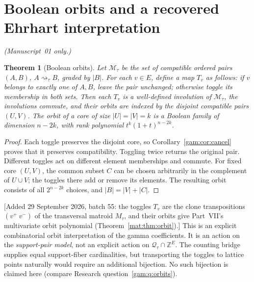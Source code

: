 \documentclass[11pt]{article}
\numberwithin{equation}{section}
\newtheorem{theorem}{Theorem}[section]
\theoremstyle{definition}
\newcommand{\Z}{\mathbb Z}
\newcommand{\Qt}{\mathcal Q_\tau}
\newcommand{\match}{\rightsquigarrow}
\begin{document}
\section{Boolean orbits and a recovered Ehrhart interpretation}\label{gam:gv:sec:orbits}
\noindent\emph{(Manuscript~01 only.)}
\begin{theorem}[Boolean orbits]\label{gam:gv:thm:orbits}
Let $\mathscr M_\tau$ be the set of compatible ordered pairs $(A,B)$,
$A\match_\tau B$, graded by $|B|$. For each $v\in E$, define a map $T_v$ as
follows: if $v$ belongs to exactly one of $A,B$, leave the pair unchanged;
otherwise toggle its membership in both sets. Then each $T_v$ is a
well-defined involution of $\mathscr M_\tau$, the involutions commute, and
their orbits are indexed by the disjoint compatible pairs $(U,V)$. The orbit
of a core of size $|U|=|V|=k$ is a Boolean family of dimension $n-2k$, with
rank polynomial $t^k(1+t)^{n-2k}$.
\end{theorem}
\begin{proof}
Each toggle preserves the disjoint core, so
Corollary~\ref{gam:cor:cancel} proves that it preserves compatibility.
Toggling twice returns the original pair. Different toggles act on different
element memberships and commute. For fixed core $(U,V)$, the common subset
$C$ can be chosen arbitrarily in the complement of $U\cup V$; the toggles
there add or remove its elements. The resulting orbit consists of all
$2^{n-2k}$ choices, and $|B|=|V|+|C|$.
\end{proof}
[Added 29 September 2026, batch 55: the toggles $T_v$ are the clone
transpositions $(v^+\ v^-)$ of the transversal matroid $M_\tau$, and their
orbits give Part~VII's multivariate orbit polynomial
(Theorem~\ref{mat:thm:orbit}).]
This is an explicit combinatorial orbit interpretation of the gamma
coefficients. It is an action on the \emph{support-pair model}, not an
explicit action on $\Qt\cap\Z^E$. The counting bridge supplies equal
support-fiber cardinalities, but transporting the toggles to lattice points
naturally would require an additional bijection. No such bijection is
claimed here (compare Research question~\ref{gam:q:orbits}).
\end{document}

